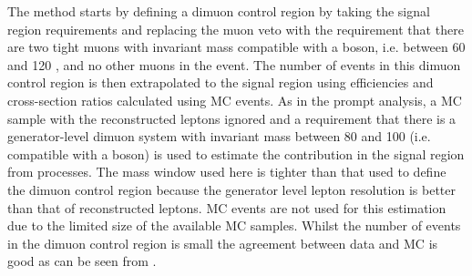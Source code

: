 The method starts by defining a dimuon control region by taking the signal region requirements and replacing the muon veto with the requirement that there are two tight muons with invariant mass compatible with a \PZ boson, i.e. between 60 and 120 \GeV, and no other muons in the event. The number of events in this dimuon control region is then extrapolated to the signal region using efficiencies and cross-section ratios calculated using \ac{MC} events. As in the prompt analysis, a \Zmumu \ac{MC} sample with the reconstructed leptons ignored and a requirement that there is a generator-level dimuon system with invariant mass between 80 and 100 \GeV (i.e. compatible with a \PZ boson) is used to estimate the contribution in the signal region from \Znunu processes. The mass window used here is tighter than that used to define the dimuon control region because the generator level lepton \pt resolution is better than that of reconstructed leptons. \Znunu \ac{MC} events are not used for this estimation due to the limited size of the available \Znunu \ac{MC} samples. Whilst the number of events in the dimuon control region is small the agreement between data and \ac{MC} is good as can be seen from .

